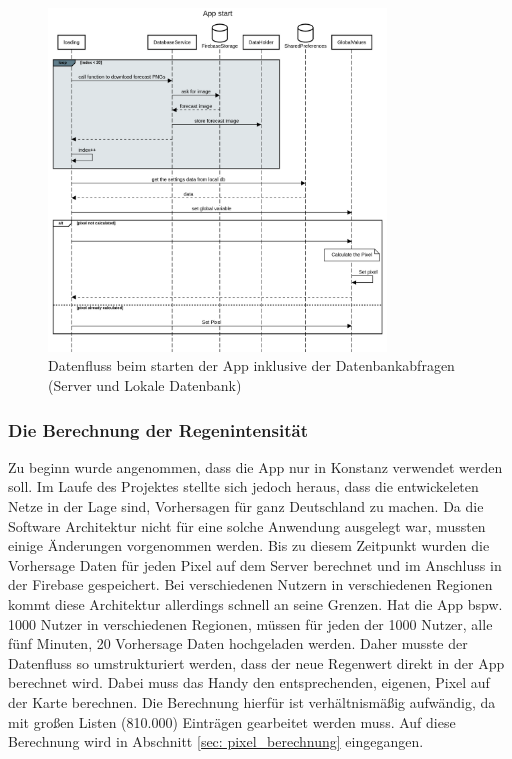 \begin{figure}[H]
 \centering
 \includegraphics[width=0.8\textwidth,angle=0]{abb/sequence_diagram_app_start}
 \caption[Sequencediagram Appstart]{Datenfluss beim starten der App inklusive der Datenbankabfragen (Server und Lokale Datenbank)}
\label{fig:sequence_diagram_app_start}
\end{figure}

\subsubsection{Die Berechnung der Regenintensität}
Zu beginn wurde angenommen, dass die App nur in Konstanz verwendet werden soll. 
Im Laufe des Projektes stellte sich jedoch heraus, dass die entwickeleten Netze in der Lage sind, Vorhersagen 
für ganz Deutschland zu machen. Da die Software Architektur nicht für eine solche Anwendung ausgelegt war, 
mussten einige Änderungen vorgenommen werden. 
Bis zu diesem Zeitpunkt wurden die Vorhersage Daten für jeden Pixel auf dem Server berechnet und im Anschluss in 
der Firebase gespeichert. 
Bei verschiedenen Nutzern in verschiedenen Regionen kommt diese Architektur allerdings schnell an seine Grenzen. 
Hat die App bspw. 1000 Nutzer in verschiedenen Regionen, 
müssen für jeden der 1000 Nutzer, alle fünf Minuten, 20 Vorhersage Daten hochgeladen werden. 
Daher musste der Datenfluss so umstrukturiert werden, dass der neue Regenwert direkt in der App berechnet wird. 
Dabei muss das Handy den entsprechenden, eigenen, Pixel auf der Karte berechnen. 
Die Berechnung hierfür ist verhältnismäßig aufwändig, da mit großen Listen (810.000) Einträgen gearbeitet werden muss.
Auf diese Berechnung wird in Abschnitt \ref{sec: pixel_berechnung} eingegangen. 

